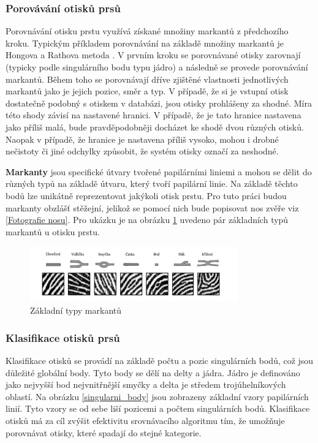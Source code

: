 \subsubsection{Porovávání otisků prsů}
Porovnávání otisku prstu využívá získané množiny markantů z předchozího kroku. Typickým příkladem porovnávání na základě množiny markantů je Hongova a Rathova metoda \cite{FITMT25007}. V prvním kroku se porovnávané otisky zarovnají (typicky podle singulárního bodu typu jádro) a následně se provede porovnávání markantů. Během toho se porovnávají dříve zjištěné vlastnosti jednotlivých markantů jako je jejich pozice, směr a typ. V případě, že si je vstupní otisk dostatečně podobný s otiskem v databázi, jsou otisky prohlášeny za shodné. Míra této shody závisí na nastavené hranici. V případě, že je tato hranice nastavena jako příliš malá, bude pravděpodobněji docházet ke shodě dvou různých otisků. Naopak v případě, že hranice je nastavena příliš vysoko, mohou i drobné nečistoty či jiné odchylky způsobit, že systém otisky označí za neshodné.

\textbf{Markanty} jsou specifické útvary tvořené papilárními liniemi a mohou se dělit do různých typů na základě útvaru, který tvoří papilární linie. Na základě těchto bodů lze unikátně reprezentovat jakýkoli otisk prstu. Pro tuto práci budou markanty obzlášť stěžejní, jelikož se pomocí nich bude popisovat nos zvěře viz \ref{Fotografie nosu}. Pro ukázku je na obrázku \ref{markanty_prst} uvedeno pár základních typů markantů u otisku prstu.



\begin{figure}[h]
	\centering
	\includegraphics[width=0.8\textwidth]{obrazky/markanty.png}
	\caption{Základní typy markantů \cite{otiskyPrstu}}
	\label{markanty_prst}
\end{figure}

\subsubsection{Klasifikace otisků prsů}
Klasifikace otisků se provádí na základě počtu a pozic singulárních bodů, což jsou důležité globální body. Tyto body se dělí na delty a jádra. Jádro je definováno jako nejvyšší bod nejvnitřnější smyčky a delta je středem trojúhelníkových oblastí. Na obrázku \ref{singularni_body} jsou zobrazeny základní vzory papilárních linií. Tyto vzory se od sebe liší pozicemi a počtem singulárních bodů. Klasifikace otisků má za cíl zvýšit efektivitu srovnávacího algoritmu tím, že umožňuje porovnávat otisky, které spadají do stejné kategorie.



